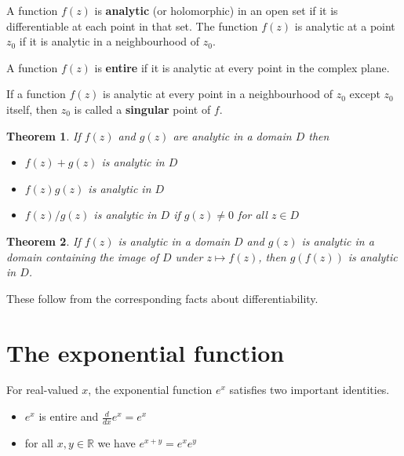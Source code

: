 \documentclass[a4paper,10pt]{article}
\newcommand{\R}{\mathbb{R}}
\newtheorem{theorem}{Theorem}[section]
\newenvironment{definition}[1][Definition]{\begin{trivlist}
\item[\hskip \labelsep {\bfseries #1}]}{\end{trivlist}}
\begin{document}
\begin{definition}
A function $f(z)$ is \textbf{analytic} (or holomorphic) in an open set if it is differentiable at each point in that set. The function $f(z)$ is analytic at a point $z_0$ if it is analytic in a neighbourhood of $z_0$.
\end{definition}

\begin{definition}
A function $f(z)$ is \textbf{entire} if it is analytic at every point in the complex plane.
\end{definition}

\begin{definition}
If a function $f(z)$ is analytic at every point in a neighbourhood of $z_0$ except $z_0$ itself, then $z_0$ is called a \textbf{singular} point of $f$.
\end{definition}

\begin{theorem}
If $f(z)$ and $g(z)$ are analytic in a domain $D$ then
\begin{itemize}
\item $f(z) + g(z)$ is analytic in $D$
\item $f(z)g(z)$ is analytic in $D$
\item $f(z)/g(z)$ is analytic in $D$ if $g(z) \neq 0$ for all $z \in D$
\end{itemize}
\end{theorem}

\begin{theorem}
If $f(z)$ is analytic in a domain $D$ and $g(z)$ is analytic in a domain containing the image of $D$ under $z \mapsto f(z)$, then $g(f(z))$ is analytic in $D$.
\end{theorem}

These follow from the corresponding facts about differentiability.

\section{The exponential function}

For real-valued $x$, the exponential function $e^x$ satisfies two important identities.

\begin{itemize}
\item $e^x$ is entire and $\frac{d}{dx}e^x = e^x$
\item for all $x, y \in \R$ we have $e^{x + y} = e^xe^y$
\end{itemize}
\end{document}
